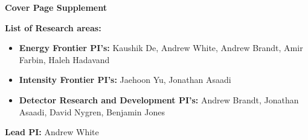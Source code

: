 \begin{center}
\noindent\textbf{\LARGE Cover Page Supplement}\newline
\end{center}

\noindent\textbf{List of Research areas:}
\begin{itemize}[noitemsep,nolistsep]
   \item \textbf{Energy Frontier PI's:} Kaushik De, Andrew White, Andrew Brandt, Amir Farbin, Haleh Hadavand
	\item \textbf{Intensity Frontier PI's:} Jaehoon Yu, Jonathan Asaadi
	\item \textbf{Detector Research and Development PI's:} Andrew Brandt, Jonathan Asaadi, David Nygren, Benjamin Jones
\end{itemize}

\noindent\textbf{Lead PI:} Andrew White
\vspace*{0.15in}

